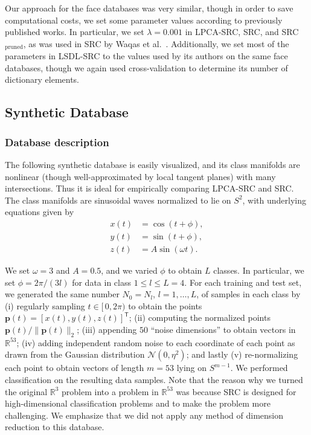 \documentclass[review]{elsarticle}
\newcommand{\transp}{\mathsf{T}}
\begin{document}
Our approach for the face databases was very similar, though in order to save computational costs, we set some parameter values according to previously published works. In particular, we set $\lambda = 0.001$ in LPCA-SRC, SRC, and SRC$_\mathrm{pruned}$, as was used in SRC by Waqas et al.\ \cite{waq:cnrc}. Additionally, we set most of the parameters in LSDL-SRC to the values used by its authors \cite{wei:lsdl} on the same face databases, though we again used cross-validation to determine its number of dictionary elements.


\subsection{Synthetic Database} 

\subsubsection{Database description}

The following synthetic database is easily visualized, and its class manifolds are nonlinear (though well-approximated by local tangent planes) with many intersections. Thus it is ideal for empirically comparing LPCA-SRC and SRC. The class manifolds are sinusoidal waves normalized to lie on $S^2$, with underlying equations given by
\begin{align*}
x(t) &= \cos(t+\phi), \\
y(t) &= \sin(t+\phi), \\
z(t) &= A \sin(\omega t).
\end{align*}


We set $\omega = 3$ and $A = 0.5$, and we varied $\phi$ to obtain $L$ classes. In particular, we set $\phi = 2 \pi/(3l)$ for data in class $1\leq l \leq L=4$. For each training and test set, we generated the same number $N_0 = N_l$, $l=1,\ldots,L$, of samples in each class by (i) regularly sampling $t \in [\,0,2\pi)$ to obtain the points $\bm{p}(t) = [x(t),y(t),z(t)]^\transp$; (ii) computing the normalized points $\bm{p}(t)/\|\bm{p}(t)\|_2$; (iii) appending $50$ ``noise dimensions'' to obtain vectors in $\mathbb{R}^{53}$; (iv) adding independent random noise to each coordinate of each point as drawn from the Gaussian distribution $\mathcal{N}(0,\eta^2)$; and lastly (v) re-normalizing each point to obtain vectors of length $ m = 53$ lying on $S^{m-1}$. We performed classification on the resulting data samples. Note that the reason why we turned the original $\mathbb{R}^3$ problem into a problem in $\mathbb{R}^{53}$ was because SRC is designed for high-dimensional classification problems \cite{wri:src} and to make the problem more challenging. We emphasize that we did not apply any method of dimension reduction to this database.
\end{document}
